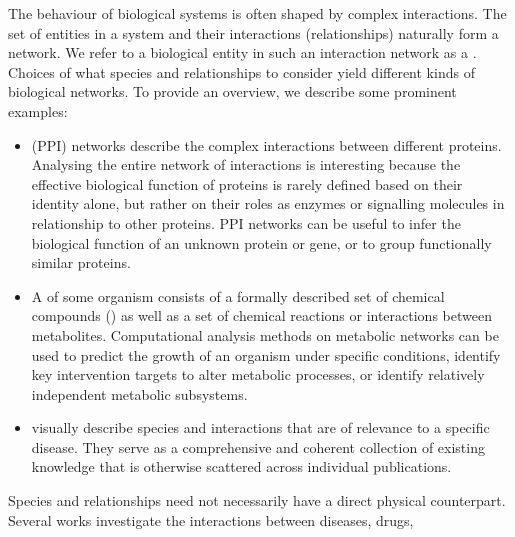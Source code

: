 \documentclass[
	fontsize=10pt, %
	twoside=true, %
	secnumdepth=1, %
  toc=indentunnumbered %
]{kaobook}
\begin{document}
The behaviour of biological systems is often shaped by complex interactions.
%
%
%
The set of entities in a system and their interactions (relationships) naturally
form a network. We refer to a biological entity in such an interaction network
as a . Choices of what species and relationships to consider yield
different kinds of biological networks. To provide an overview, we describe some
prominent examples:
\begin{itemize}
\item {} (PPI) networks describe the complex
  interactions between different proteins. Analysing the entire network of
  interactions is interesting because the effective biological function of
  proteins is rarely defined based on their identity alone, but rather on their
  roles as enzymes or signalling molecules in relationship to other proteins.
  \textsc{PPI} networks can be useful to infer the biological function of an
  unknown protein or gene, or to group functionally similar proteins.
\item A  of some organism consists of a formally described
  set of chemical compounds () as well as a set of chemical
  reactions or interactions between metabolites. Computational analysis
  methods on metabolic networks can be used to predict the growth of an organism
  under specific conditions, identify key intervention targets to alter
  metabolic processes, or identify relatively independent metabolic subsystems.
\item {} visually describe species and interactions that are of
  relevance to a specific disease. They serve as a comprehensive and coherent
  collection of existing knowledge that is otherwise scattered across individual
  publications.
\end{itemize}
Species and relationships need not necessarily have a direct physical
counterpart. Several works investigate the interactions between diseases, drugs,
\end{document}
